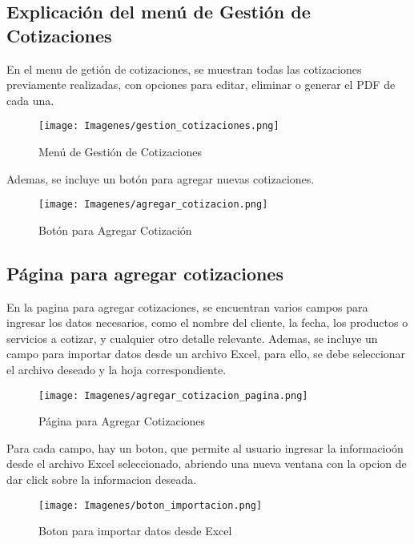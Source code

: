 \documentclass{Pretexto/bluereport}
\begin{document}
\subsection{Explicación del menú de Gestión de Cotizaciones}

En el menu de getión de cotizaciones, se muestran todas las cotizaciones previamente realizadas, con opciones para editar, eliminar o generar el PDF de cada una.

\begin{figure}[H]
    \centering
    \texttt{[image: Imagenes/gestion\_cotizaciones.png]}
    \caption{Menú de Gestión de Cotizaciones}
    \label{fig:gestion_cotizaciones}
\end{figure}

Ademas, se incluye un botón para agregar nuevas cotizaciones.

\begin{figure}[H]
    \centering
    \texttt{[image: Imagenes/agregar\_cotizacion.png]}
    \caption{Botón para Agregar Cotización}
    \label{fig:agregar_cotizacion}
\end{figure}

\subsection{Página para agregar cotizaciones}

En la pagina para agregar cotizaciones, se encuentran varios campos para ingresar los datos necesarios, como el nombre del cliente, la fecha, los productos o servicios a cotizar, y cualquier otro detalle relevante.
Ademas, se incluye un campo para importar datos desde un archivo Excel, para ello, se debe seleccionar el archivo deseado y la hoja correspondiente.

\begin{figure}[H]
    \centering
    \texttt{[image: Imagenes/agregar\_cotizacion\_pagina.png]}
    \caption{Página para Agregar Cotizaciones}
    \label{fig:agregar_cotizacion_pagina}
\end{figure}

Para cada campo, hay un boton, que permite al usuario ingresar la informacioón desde el archivo Excel seleccionado, abriendo una nueva ventana con la opcion de dar click sobre la informacion deseada.

\begin{figure}[H]
    \centering
    \texttt{[image: Imagenes/boton\_importacion.png]}
    \caption{Boton para importar datos desde Excel}
    \label{fig:importar_datos}
\end{figure}
\end{document}

